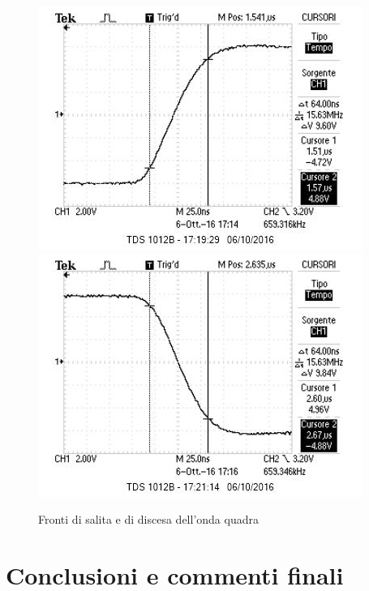 \documentclass[10pt,a4paper]{article}
\begin{document}
\begin{figure}[h]
	\centering
	\includegraphics[scale=0.6]{../Oscilloscopio/raise_time.jpg}
	\includegraphics[scale=0.6]{../Oscilloscopio/fall_time.jpg}
	\caption{Fronti di salita e di discesa dell'onda quadra}
	\label{f:sqmhz}
\end{figure}

\section{Conclusioni e commenti finali}
\end{document}

